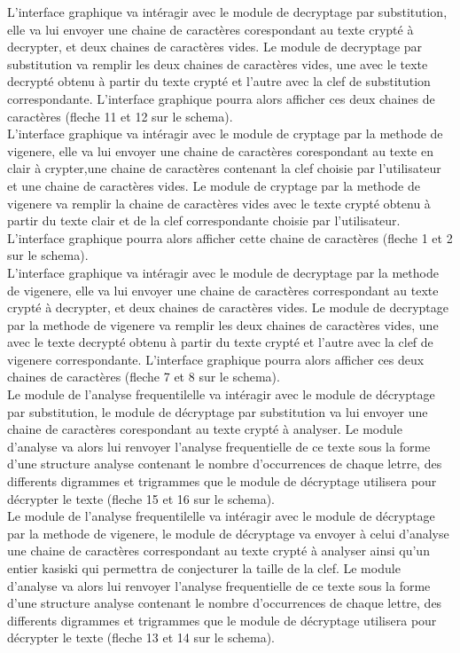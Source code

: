 \documentclass[a4]{article}
\begin{document}
	L'interface graphique va intéragir avec le module de decryptage par substitution, elle va lui envoyer une 
	chaine de caractères corespondant au texte crypté à decrypter, et deux chaines de caractères vides. Le module 
	de decryptage par substitution va remplir les deux chaines de caractères vides, une avec le texte decrypté obtenu
	 à partir du texte crypté et l'autre avec la clef de substitution correspondante. L'interface graphique pourra 
	 alors afficher ces deux chaines de caractères (fleche 11 et 12 sur le schema). \\

	L'interface graphique va intéragir avec le module de cryptage par la methode de vigenere, elle va lui envoyer une
	 chaine de caractères corespondant au texte en clair à crypter,une chaine de caractères contenant la clef choisie par 
	 l'utilisateur et une chaine de caractères vides. Le module de cryptage par la methode de vigenere va remplir la chaine
	  de caractères vides avec le texte crypté obtenu à partir du texte clair et de la clef correspondante choisie par
	   l'utilisateur. L'interface graphique pourra alors afficher cette chaine de caractères (fleche 1 et 2 sur le schema). \\

	L'interface graphique va intéragir avec le module de decryptage par la methode de vigenere, elle va lui envoyer une 
	chaine de caractères correspondant au texte crypté à decrypter, et deux chaines de caractères vides. Le module de 
	decryptage par la methode de vigenere va remplir les deux chaines de caractères vides, une avec le texte decrypté 
	obtenu à partir du texte crypté et l'autre avec la clef de vigenere correspondante. L'interface graphique pourra 
	alors afficher ces deux chaines de caractères (fleche 7 et 8 sur le schema). \\

	Le module de l'analyse frequentilelle va intéragir avec le module de décryptage par substitution,
	 le module de décryptage par substitution va lui envoyer une chaine de caractères corespondant au texte 
	 crypté à analyser. Le module d'analyse va alors lui renvoyer l'analyse frequentielle de ce texte sous 
	 la forme d'une structure analyse contenant le nombre d'occurrences de chaque letrre, des differents digrammes 
	 et trigrammes que le module de décryptage utilisera pour décrypter le texte (fleche 15 et 16 sur le schema). \\

	Le module de l'analyse frequentilelle va intéragir avec le module de décryptage par la methode de vigenere, 
	le module de décryptage va envoyer à celui d'analyse une chaine de caractères correspondant au texte crypté à
	 analyser ainsi qu'un entier kasiski qui permettra de conjecturer la taille de la clef. Le module d'analyse va 
	 alors lui renvoyer l'analyse frequentielle de ce texte sous la forme d'une structure analyse contenant le nombre
	  d'occurrences de chaque lettre, des differents digrammes et trigrammes que le module de décryptage utilisera pour 
	  décrypter le texte (fleche 13 et 14 sur le schema). \\
\end{document}
